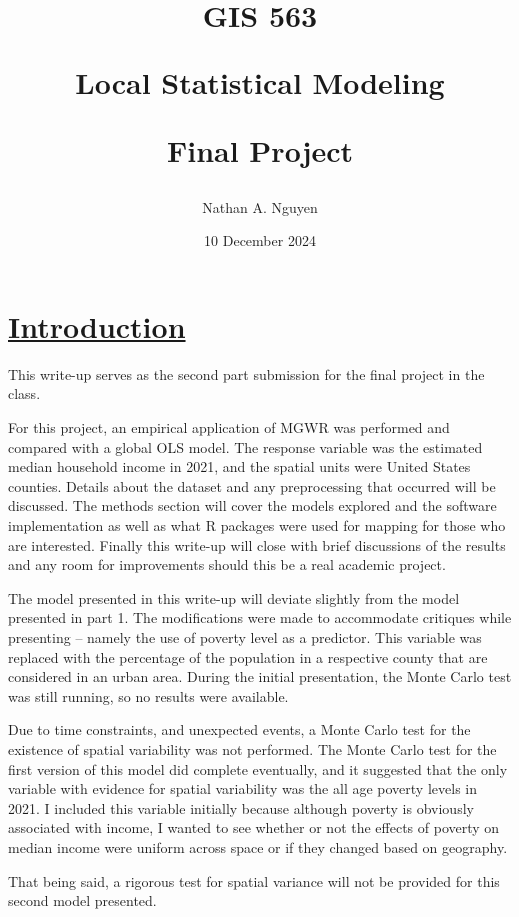 \documentclass[
]{article}
\title{\vspace{5cm}

GIS 563

Local Statistical Modeling

Final Project}
\author{Nathan A. Nguyen}
\date{10 December 2024}
\begin{document}
\maketitle

\newpage

\section{\texorpdfstring{\ul{Introduction}}{Introduction}}\label{introduction}

This write-up serves as the second part submission for the final project
in the class.

For this project, an empirical application of MGWR was performed and
compared with a global OLS model. The response variable was the
estimated median household income in 2021, and the spatial units were
United States counties. Details about the dataset and any preprocessing
that occurred will be discussed. The methods section will cover the
models explored and the software implementation as well as what R
packages were used for mapping for those who are interested. Finally
this write-up will close with brief discussions of the results and any
room for improvements should this be a real academic project.

The model presented in this write-up will deviate slightly from the
model presented in part 1. The modifications were made to accommodate
critiques while presenting -- namely the use of poverty level as a
predictor. This variable was replaced with the percentage of the
population in a respective county that are considered in an urban area.
During the initial presentation, the Monte Carlo test was still running,
so no results were available.

Due to time constraints, and unexpected events, a Monte Carlo test for
the existence of spatial variability was not performed. The Monte Carlo
test for the first version of this model did complete eventually, and it
suggested that the only variable with evidence for spatial variability
was the all age poverty levels in 2021. I included this variable
initially because although poverty is obviously associated with income,
I wanted to see whether or not the effects of poverty on median income
were uniform across space or if they changed based on geography.

That being said, a rigorous test for spatial variance will not be
provided for this second model presented.

\newpage
\end{document}
